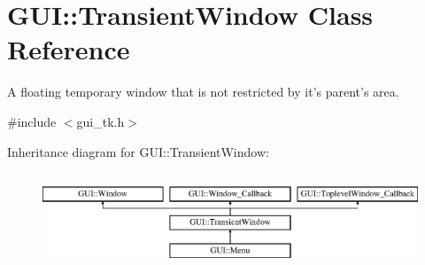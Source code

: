 \hypertarget{classGUI_1_1TransientWindow}{\section{G\-U\-I\-:\-:Transient\-Window Class Reference}
\label{classGUI_1_1TransientWindow}
}


A floating temporary window that is not restricted by it's parent's area.  




{\ttfamily \#include $<$gui\-\_\-tk.\-h$>$}

Inheritance diagram for G\-U\-I\-:\-:Transient\-Window\-:\begin{figure}[H]
\begin{center}
\leavevmode
\includegraphics[height=2.886598cm]{classGUI_1_1TransientWindow}
\end{center}
\end{figure}

